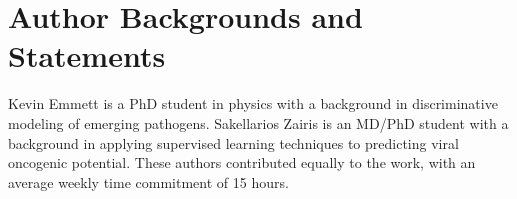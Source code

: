 \documentclass[letterpaper, 11pt]{article}
\begin{document}
\section{Author Backgrounds and Statements}

Kevin Emmett is a PhD student in physics with a background in discriminative modeling of emerging pathogens. Sakellarios Zairis is an MD/PhD student with a background in applying supervised learning techniques to predicting viral oncogenic potential.  These authors contributed equally to the work, with an average weekly time commitment of 15 hours.


\end{document}
